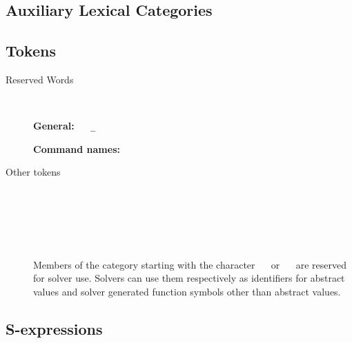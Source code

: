 {\begin{minipage}{.95\linewidth}
\end{minipage}

\subsection*{Auxiliary Lexical Categories}

\aLexical

\newpage
\subsection*{Tokens}

\begin{description}

\item[Reserved Words]
\ 
\medskip

\begin{minipage}{.95\linewidth}
\textbf{General:} \ 
\ter{!} \ 
\verb|_| \ 
 \ 
 \ 
 \ 
 \ 
 \ 
 \ 
 \ 
 \ 
 \ 
 \ 
\medskip


\textbf{Command names:}
\ter{assert} \ 
 \ 
 \ 
 \ 
 \ 
 \ 
 \ 
 \ 
 \ 
 \ 
 \ 
 \ 
 \ 
 \ 
 \ 
 \ 
 \ 
 \ 
 \ 
 \ 
 \ 
 \ 
 \ 
 \ 
 \ 
 \ 
 \ 
 \ 
\end{minipage}
\medskip


\item[Other tokens]
\ 
\medskip

\ \ter{(} 

\ \ter{)}

\tokens
\medskip

\noindent
Members of the \nter{symbol} category starting with the character
\ \ter{@} \ or \  \  are reserved for solver use.
Solvers can use them respectively as identifiers for abstract values and
solver generated function symbols other than abstract values.
\end{description}


\subsection*{S-expressions}
\ 

}
